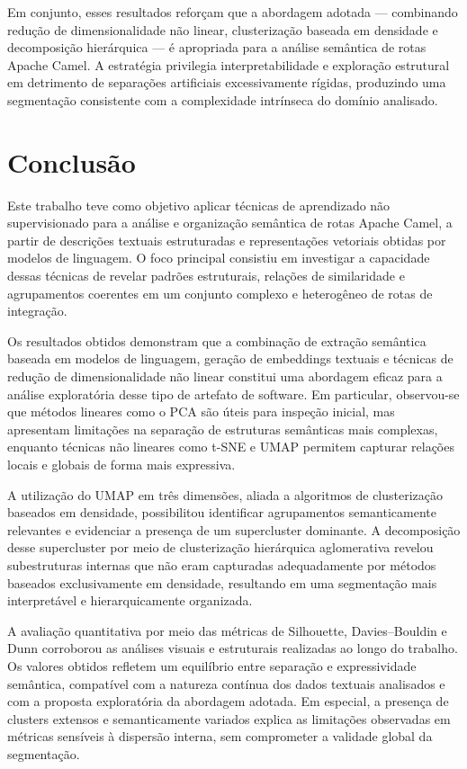 \documentclass[12pt,a4paper]{article}
\begin{document}
Em conjunto, esses resultados reforçam que a abordagem adotada — combinando redução de dimensionalidade não linear, clusterização baseada em densidade e decomposição hierárquica — é apropriada para a análise semântica de rotas Apache Camel. A estratégia privilegia interpretabilidade e exploração estrutural em detrimento de separações artificiais excessivamente rígidas, produzindo uma segmentação consistente com a complexidade intrínseca do domínio analisado.



\section{Conclusão}

Este trabalho teve como objetivo aplicar técnicas de aprendizado não supervisionado para a análise e organização semântica de rotas Apache Camel, a partir de descrições textuais estruturadas e representações vetoriais obtidas por modelos de linguagem. O foco principal consistiu em investigar a capacidade dessas técnicas de revelar padrões estruturais, relações de similaridade e agrupamentos coerentes em um conjunto complexo e heterogêneo de rotas de integração.

Os resultados obtidos demonstram que a combinação de extração semântica baseada em modelos de linguagem, geração de embeddings textuais e técnicas de redução de dimensionalidade não linear constitui uma abordagem eficaz para a análise exploratória desse tipo de artefato de software. Em particular, observou-se que métodos lineares como o PCA são úteis para inspeção inicial, mas apresentam limitações na separação de estruturas semânticas mais complexas, enquanto técnicas não lineares como t-SNE e UMAP permitem capturar relações locais e globais de forma mais expressiva.

A utilização do UMAP em três dimensões, aliada a algoritmos de clusterização baseados em densidade, possibilitou identificar agrupamentos semanticamente relevantes e evidenciar a presença de um supercluster dominante. A decomposição desse supercluster por meio de clusterização hierárquica aglomerativa revelou subestruturas internas que não eram capturadas adequadamente por métodos baseados exclusivamente em densidade, resultando em uma segmentação mais interpretável e hierarquicamente organizada.

A avaliação quantitativa por meio das métricas de Silhouette, Davies–Bouldin e Dunn corroborou as análises visuais e estruturais realizadas ao longo do trabalho. Os valores obtidos refletem um equilíbrio entre separação e expressividade semântica, compatível com a natureza contínua dos dados textuais analisados e com a proposta exploratória da abordagem adotada. Em especial, a presença de clusters extensos e semanticamente variados explica as limitações observadas em métricas sensíveis à dispersão interna, sem comprometer a validade global da segmentação.
\end{document}
